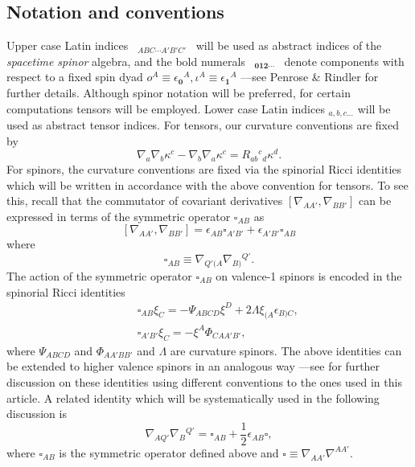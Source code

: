 \documentclass[10pt,a4paper]{article}
\theoremstyle{plain}
\begin{document}
\subsection*{Notation and conventions}
Upper case Latin indices ~$_{ABC\cdots A'B'C'}$~ will be used as
abstract indices of the \emph{spacetime spinor} algebra, and the bold
numerals ~$_{\bm0\bm1\bm2\cdots}$~ denote components with respect to a
fixed spin dyad $ o^A\equiv
\epsilon_{\bm0}{}^A,\iota^A\equiv\epsilon_{\bm1}{}^A $ ---see Penrose
\& Rindler \cite{PenRin84} for further details.  Although spinor
notation will be preferred, for certain computations tensors will be
employed. Lower case Latin indices $_{a,b,c...}$ will be used as
abstract tensor indices.  For tensors, our curvature conventions are
fixed by
\[\nabla_{a}\nabla_{b}\kappa^c-\nabla_{b}\nabla_{a}\kappa^c=R_{ab}{}^{c}{}_{d}\kappa^{d}.\]
For spinors, the curvature conventions are fixed via the spinorial
Ricci identities which will be written in accordance with the above
convention for tensors.  To see this, recall that the commutator of
covariant derivatives $[ \nabla_{AA'},\nabla_{BB'}]$ can be expressed
in terms of the symmetric operator $\square_{AB}$ as
\[
[ \nabla_{AA'},\nabla_{BB'}]= \epsilon_{AB}\square_{A'B'} +
\epsilon_{A'B'}\square_{AB}
\]
where
\[
\square_{AB} \equiv \nabla_{Q'(A} \nabla_{B)}{}^{Q'}.
\]
 The action of the symmetric operator $\square_{AB}$ on valence-1
 spinors is encoded in the spinorial Ricci identities
\begin{subequations}
\begin{eqnarray}
&& \square_{AB}\xi_{C}=-\Psi_{ABCD} \xi^{D} +
  2\Lambda\xi_{(A}\epsilon_{B)C},
 \label{SpinorialRicciIdentities1} \\
&& \square_{A'B'}\xi_{C}=-\xi^{A}\Phi_{CA A' B'},
\label{SpinorialRicciIdentities2}
\end{eqnarray}
\end{subequations}
where $\Psi_{ABCD}$ and $\Phi_{AA'BB'}$ and $\Lambda$ are curvature spinors.
 The above identities can be extended to higher valence spinors in an
 analogous way ---see \cite{Ste91} for further discussion on these
 identities using different conventions to the ones used in this
 article. A related identity which will be systematically used in the
 following discussion is
\begin{equation}\label{DecomposeDoubleDerivativeContracted}
\nabla_{AQ'}\nabla_{B}{}^{Q'}=\square_{AB}+
\frac{1}{2}\epsilon_{AB}\square,
\end{equation}
where $\square_{AB}$ is the symmetric operator defined above and
$\square \equiv \nabla_{AA'}\nabla^{AA'}.$
\end{document}
